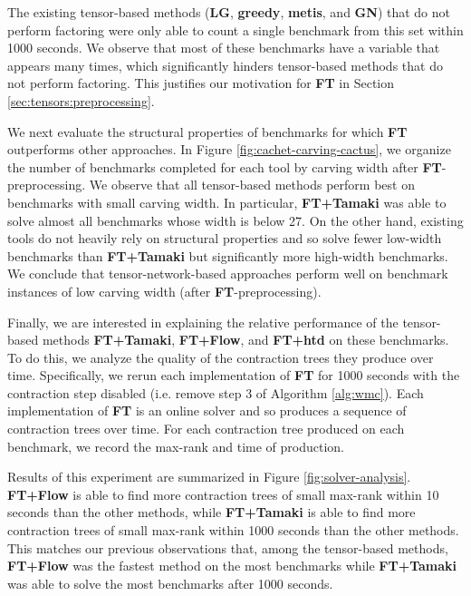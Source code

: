 The existing tensor-based methods (\textbf{LG}, \textbf{greedy}, \textbf{metis}, and \textbf{GN}) that do not perform factoring were only able to count a single benchmark from this set within 1000 seconds. We observe that most of these benchmarks have a variable that appears many times, which significantly hinders tensor-based methods that do not perform factoring. This justifies our motivation for \textbf{FT} in Section \ref{sec:tensors:preprocessing}.

We next evaluate the structural properties of benchmarks for which \textbf{FT} outperforms other approaches. In Figure \ref{fig:cachet-carving-cactus}, we organize the number of benchmarks completed for each tool by carving width after \textbf{FT}-preprocessing. We observe that all tensor-based methods perform best on benchmarks with small carving width. In particular, \textbf{FT+Tamaki} was able to solve almost all benchmarks whose width is below 27. On the other hand, existing tools do not heavily rely on structural properties and so solve fewer low-width benchmarks than \textbf{FT+Tamaki} but significantly more high-width benchmarks. We conclude that tensor-network-based approaches perform well on benchmark instances of low carving width (after  \textbf{FT}-preprocessing).

Finally, we are interested in explaining the relative performance of the tensor-based methods \textbf{FT+Tamaki}, \textbf{FT+Flow}, and \textbf{FT+htd} on these benchmarks. To do this, we analyze the quality of the contraction trees they produce over time. Specifically, we rerun each implementation of \textbf{FT} for 1000 seconds with the contraction step disabled (i.e. remove step 3 of Algorithm \ref{alg:wmc}). Each implementation of \textbf{FT} is an online solver and so produces a sequence of contraction trees over time. For each contraction tree produced on each benchmark, we record the max-rank and time of production.

Results of this experiment are summarized in Figure \ref{fig:solver-analysis}. 
\textbf{FT+Flow} is able to find more contraction trees of small max-rank within 10 seconds than the other methods, while \textbf{FT+Tamaki} is able to find more contraction trees of small max-rank within 1000 seconds than the other methods. This matches our previous observations that, among the tensor-based methods, \textbf{FT+Flow} was the fastest method on the most benchmarks while \textbf{FT+Tamaki} was able to solve the most benchmarks after 1000 seconds.


